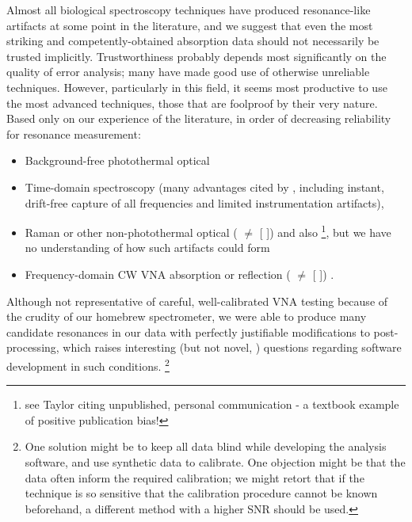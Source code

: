 \documentclass[paper.tex]{subfiles}
\begin{document}
\begin{multicols}{1}
Almost all biological spectroscopy techniques have produced resonance-like artifacts at some point in the literature, and we suggest that even the most striking and competently-obtained absorption data should not necessarily be trusted implicitly. Trustworthiness probably depends most significantly on the quality of error analysis; many have made good use of otherwise unreliable techniques. However, particularly in this field, it seems most productive to use the most advanced techniques, those that are foolproof by their very nature. Based only on our experience of the literature, in order of decreasing reliability for resonance measurement:

\begin{itemize}
\item Background-free photothermal optical \cite{Microwave1993a}\cite{Broadband1988}
\item Time-domain spectroscopy (many advantages cited by \cite{Time2003}, including instant, drift-free capture of all frequencies and limited instrumentation artifacts), \cite{Dielectric2004}\cite{Microwave1994}
\item Raman or other non-photothermal optical (\cite{optical1983} $\neq$ [\cite{Resonances1987} \cite{Dielectric1989}]) and also \footnote{see Taylor \cite{mechanisms1981} citing unpublished, personal communication - a textbook example of positive publication bias!}, but we have no understanding of how such artifacts could form
\item Frequency-domain CW VNA absorption or reflection (\cite{Microwave1982} $\neq$ [\cite{Resonances1987} \cite{Dielectric1989}]) \cite{Substitution1982} \cite{Millimeter1980}.
\end{itemize}

Although not representative of careful, well-calibrated VNA testing because of the crudity of our homebrew spectrometer, we were able to produce many candidate resonances in our data with perfectly justifiable modifications to post-processing, which raises interesting (but not novel\cite{Blindinga}, \cite{Reanalysis2020}\cite{statistical2020}) questions regarding software development in such conditions. \footnote{One solution might be to keep all data blind while developing the analysis software, and use synthetic data to calibrate. One objection might be that the data often inform the required calibration; we might retort that if the technique is so sensitive that the calibration procedure cannot be known beforehand, a different method with a higher SNR should be used.}



\end{multicols}
\end{document}
